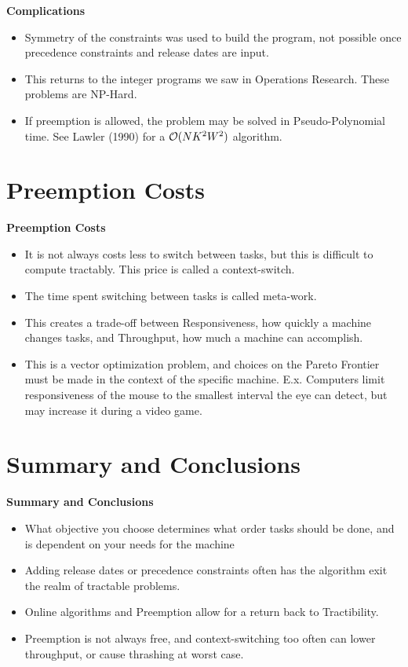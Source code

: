 \documentclass[grey,handout]{beamer}
\renewcommand{\frametitle}[1]{\begin{center}\textbf{#1}\end{center}}
\def\BigO{{\cal O}}
\begin{document}
\begin{frame}
  \frametitle{Complications}
  \begin{itemize}
  \item Symmetry of the constraints was used to build the program, not possible
    once precedence constraints and release dates are input.
  \item This returns to the integer programs we saw in Operations
    Research. These problems are NP-Hard.
  \item If preemption is allowed, the problem may be solved in Pseudo-Polynomial
    time. See Lawler (1990) for a $\BigO( N K^2 W^2)$ algorithm.
  \end{itemize}
\end{frame}

\section{Preemption Costs}

\begin{frame}
  \frametitle{Preemption Costs}
  \begin{itemize}
  \item It is not always costs less to switch between tasks, but this is
    difficult to compute tractably. This price is called a context-switch.
  \item The time spent switching between tasks is called meta-work.
  \item This creates a trade-off between Responsiveness, how quickly a machine
    changes tasks, and Throughput, how much a machine can accomplish.
  \item This is a vector optimization problem, and choices on the Pareto
    Frontier must be made in the context of the specific machine. E.x. Computers
    limit responsiveness of the mouse to the smallest interval the eye can
    detect, but may increase it during a video game.
  \end{itemize}
\end{frame}

\section{Summary and Conclusions}

\begin{frame}
  \frametitle{Summary and Conclusions}
  \begin{itemize}[<+->]
  \item What objective you choose determines what order tasks should
    be done, and is dependent on your needs for the machine
  \item Adding release dates or precedence constraints often has the
    algorithm exit the realm of tractable problems.
  \item Online algorithms and Preemption allow for a return back to
    Tractibility.
  \item Preemption is not always free, and context-switching too often
    can lower throughput, or cause thrashing at worst case.
  \end{itemize}
\end{frame}
\end{document}
